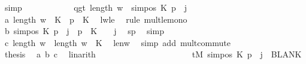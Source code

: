 \begin{isabellebody}
\ simp\isanewline
\ \ \ \ \ \ \ \ \ \ \isamarkupfalse%
\ qgt{\isacharcolon}{\kern0pt}\ {\isachardoublequoteopen}length\ {\isacharquery}{\kern0pt}w{\isacharprime}{\kern0pt}\ {\isacharless}{\kern0pt}\ sim{\isacharunderscore}{\kern0pt}pos\ {\isacharquery}{\kern0pt}K\ p\ {\isacharplus}{\kern0pt}\ j{\isachardoublequoteclose}\isanewline
\ \ \ \ \ \ \ \ \ \ \isamarkupfalse%
\ {\isacharminus}{\kern0pt}\isanewline
\ \ \ \ \ \ \ \ \ \ \ \ \isamarkupfalse%
\ a{\isacharcolon}{\kern0pt}\ {\isachardoublequoteopen}length\ w\ {\isacharasterisk}{\kern0pt}\ {\isacharquery}{\kern0pt}K\ {\isasymle}\ p{}\ {\isacharasterisk}{\kern0pt}\ {\isacharquery}{\kern0pt}K{\isachardoublequoteclose}\ \isamarkupfalse%
\ lwle\ \isamarkupfalse%
\ {\isacharparenleft}{\kern0pt}rule\ mult{\isacharunderscore}{\kern0pt}le{\isacharunderscore}{\kern0pt}mono{}{\isacharparenright}{\kern0pt}\isanewline
\ \ \ \ \ \ \ \ \ \ \ \ \isamarkupfalse%
\ b{\isacharcolon}{\kern0pt}\ {\isachardoublequoteopen}sim{\isacharunderscore}{\kern0pt}pos\ {\isacharquery}{\kern0pt}K\ p\ {\isacharplus}{\kern0pt}\ j\ {\isacharequal}{\kern0pt}\ p{}\ {\isacharasterisk}{\kern0pt}\ {\isacharquery}{\kern0pt}K\ {\isacharplus}{\kern0pt}\ {}\ {\isacharplus}{\kern0pt}\ j{\isachardoublequoteclose}\ \isamarkupfalse%
\ sp\ \isamarkupfalse%
\ simp\isanewline
\ \ \ \ \ \ \ \ \ \ \ \ \isamarkupfalse%
\ c{\isacharcolon}{\kern0pt}\ {\isachardoublequoteopen}length\ {\isacharquery}{\kern0pt}w{\isacharprime}{\kern0pt}\ {\isacharequal}{\kern0pt}\ length\ w\ {\isacharasterisk}{\kern0pt}\ {\isacharquery}{\kern0pt}K{\isachardoublequoteclose}\ \isamarkupfalse%
\ len{\isacharunderscore}{\kern0pt}w{\isacharprime}{\kern0pt}\ \isamarkupfalse%
\ {\isacharparenleft}{\kern0pt}simp\ add{\isacharcolon}{\kern0pt}\ mult{\isachardot}{\kern0pt}commute{\isacharparenright}{\kern0pt}\isanewline
\ \ \ \ \ \ \ \ \ \ \ \ \isamarkupfalse%
\ {\isacharquery}{\kern0pt}thesis\ \isamarkupfalse%
\ a\ b\ c\ \isamarkupfalse%
\ linarith\isanewline
\ \ \ \ \ \ \ \ \ \ \isamarkupfalse%
\isanewline
\ \ \ \ \ \ \ \ \ \ \isamarkupfalse%
\ {\isachardoublequoteopen}{\isacharquery}{\kern0pt}tM{\isacharprime}{\kern0pt}\ {\isacharparenleft}{\kern0pt}sim{\isacharunderscore}{\kern0pt}pos\ {\isacharquery}{\kern0pt}K\ p\ {\isacharplus}{\kern0pt}\ j{\isacharparenright}{\kern0pt}\ {\isacharequal}{\kern0pt}\ BLANK{}{\isachardoublequoteclose}\isanewline

\end{isabellebody}
